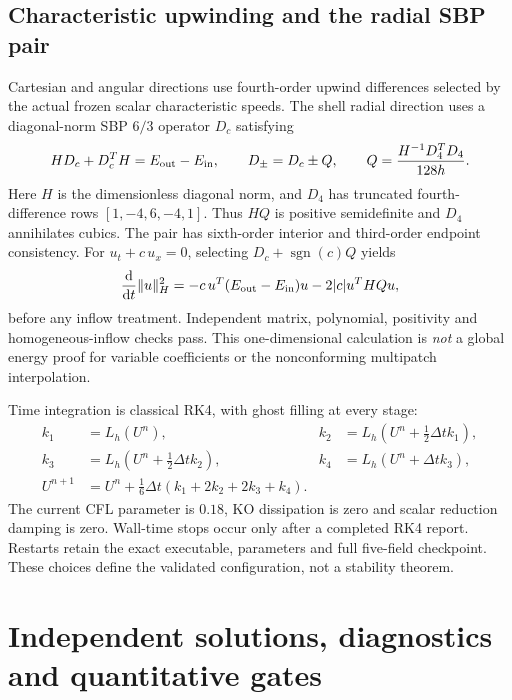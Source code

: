 \documentclass[11pt,letterpaper]{article}
\newcommand{\dd}{\mathrm{d}}
\begin{document}
\subsection{Characteristic upwinding and the radial SBP pair}
Cartesian and angular directions use fourth-order upwind differences selected by the actual frozen scalar characteristic speeds. The shell radial direction uses a diagonal-norm SBP $6/3$ operator $D_c$ satisfying
\begin{equation}
 HD_c+D_c^{T}H=E_{\rm out}-E_{\rm in},\qquad
 D_\pm=D_c\pm Q,\qquad Q=\frac{H^{-1}D_4^{T}D_4}{128h}.
\end{equation}
Here $H$ is the dimensionless diagonal norm, and $D_4$ has truncated fourth-difference rows $[1,-4,6,-4,1]$. Thus $HQ$ is positive semidefinite and $D_4$ annihilates cubics. The pair has sixth-order interior and third-order endpoint consistency. For $u_t+c\,u_x=0$, selecting $D_c+\operatorname{sgn}(c)Q$ yields
\begin{equation}
 \frac{\dd}{\dd t}\|u\|_H^2
 =-c\,u^T(E_{\rm out}-E_{\rm in})u-2|c|u^THQu,
\end{equation}
before any inflow treatment. Independent matrix, polynomial, positivity and homogeneous-inflow checks pass. This one-dimensional calculation is \emph{not} a global energy proof for variable coefficients or the nonconforming multipatch interpolation.

Time integration is classical RK4, with ghost filling at every stage:
\begin{align}
 k_1&=L_h(U^n),&k_2&=L_h(U^n+\tfrac12\Delta t k_1),\\
 k_3&=L_h(U^n+\tfrac12\Delta t k_2),&k_4&=L_h(U^n+\Delta t k_3),\\
 U^{n+1}&=U^n+\tfrac16\Delta t(k_1+2k_2+2k_3+k_4).&&
\end{align}
The current CFL parameter is $0.18$, KO dissipation is zero and scalar reduction damping is zero. Wall-time stops occur only after a completed RK4 report. Restarts retain the exact executable, parameters and full five-field checkpoint. These choices define the validated configuration, not a stability theorem.

\clearpage
\section{Independent solutions, diagnostics and quantitative gates}
\end{document}
